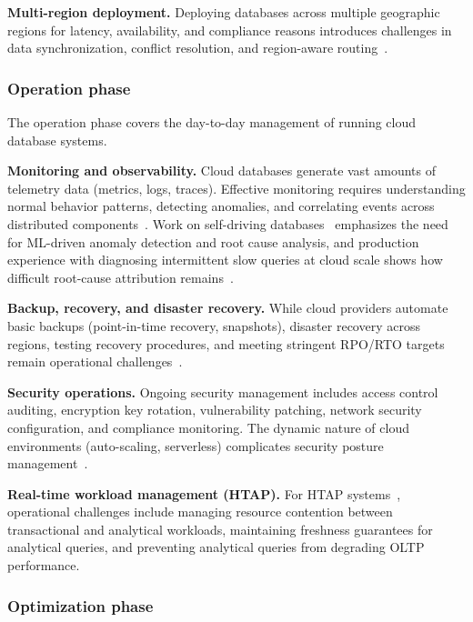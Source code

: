 \documentclass[a4paper,fleqn]{cas-sc}
\begin{document}
\textbf{Multi-region deployment.} Deploying databases across multiple geographic regions for latency, availability, and compliance reasons introduces challenges in data synchronization, conflict resolution, and region-aware routing~\cite{Corbett2013Spanner}.

\subsubsection{Operation phase}
\label{subsubsec:operation}

The operation phase covers the day-to-day management of running cloud database systems.

\textbf{Monitoring and observability.} Cloud databases generate vast amounts of telemetry data (metrics, logs, traces). Effective monitoring requires understanding normal behavior patterns, detecting anomalies, and correlating events across distributed components~\cite{Ma2021LearnedWorkload}. Work on self-driving databases~\cite{Pavlo2017SelfDriving} emphasizes the need for ML-driven anomaly detection and root cause analysis, and production experience with diagnosing intermittent slow queries at cloud scale shows how difficult root-cause attribution remains~\cite{Ma2020SlowQuery}.

\textbf{Backup, recovery, and disaster recovery.} While cloud providers automate basic backups (point-in-time recovery, snapshots), disaster recovery across regions, testing recovery procedures, and meeting stringent RPO/RTO targets remain operational challenges~\cite{Verbitski2017}.

\textbf{Security operations.} Ongoing security management includes access control auditing, encryption key rotation, vulnerability patching, network security configuration, and compliance monitoring. The dynamic nature of cloud environments (auto-scaling, serverless) complicates security posture management~\cite{Sanka2022CloudSecSurvey}.

\textbf{Real-time workload management (HTAP).} For HTAP systems~\cite{Haas2024HTAPSurvey}, operational challenges include managing resource contention between transactional and analytical workloads, maintaining freshness guarantees for analytical queries, and preventing analytical queries from degrading OLTP performance.

\subsubsection{Optimization phase}
\label{subsubsec:optimization}
\end{document}
